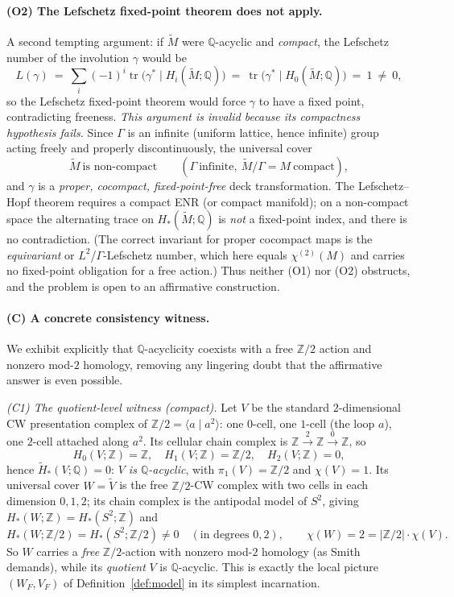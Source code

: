 \documentclass[12pt]{article}
\theoremstyle{definition}
\begin{document}
\paragraph{(O2) The Lefschetz fixed-point theorem does not apply.}
A second tempting argument: if $\widetilde M$ were $\mathbb{Q}$-acyclic and
\emph{compact}, the Lefschetz number of the involution $\gamma$ would be
\[
   L(\gamma)\ =\ \sum_i(-1)^i\operatorname{tr}\big(\gamma^*\mid
   H_i(\widetilde M;\mathbb{Q})\big)\ =\ \operatorname{tr}\big(\gamma^*\mid
   H_0(\widetilde M;\mathbb{Q})\big)\ =\ 1\ \neq\ 0,
\]
so the Lefschetz fixed-point theorem would force $\gamma$ to have a fixed point,
contradicting freeness. \emph{This argument is invalid because its compactness
hypothesis fails.} Since $\Gamma$ is an infinite (uniform lattice, hence
infinite) group acting freely and properly discontinuously, the universal cover
\[
   \widetilde M\ \text{is non-compact}\qquad(\Gamma\ \text{infinite},\
   \widetilde M/\Gamma=M\ \text{compact}),
\]
and $\gamma$ is a \emph{proper, cocompact, fixed-point-free} deck
transformation. The Lefschetz--Hopf theorem requires a compact ENR (or compact
manifold); on a non-compact space the alternating trace on
$H_*(\widetilde M;\mathbb{Q})$ is \emph{not} a fixed-point index, and there is no
contradiction. (The correct invariant for proper cocompact maps is the
\emph{equivariant} or $L^2$/$\Gamma$-Lefschetz number, which here equals
$\chi^{(2)}(M)$ and carries no fixed-point obligation for a free action.) Thus
neither (O1) nor (O2) obstructs, and the problem is open to an affirmative
construction.

\paragraph{(C) A concrete consistency witness.}
We exhibit explicitly that $\mathbb{Q}$-acyclicity coexists with a free
$\mathbb{Z}/2$ action and nonzero mod-$2$ homology, removing any lingering doubt
that the affirmative answer is even possible.

\emph{(C1) The quotient-level witness (compact).} Let $V$ be the standard
$2$-dimensional CW presentation complex of $\mathbb{Z}/2=\langle a\mid
a^2\rangle$: one $0$-cell, one $1$-cell (the loop $a$), one $2$-cell attached
along $a^2$. Its cellular chain complex is
$\mathbb{Z}\xrightarrow{\,2\,}\mathbb{Z}\xrightarrow{\,0\,}\mathbb{Z}$, so
\[
   H_0(V;\mathbb{Z})=\mathbb{Z},\quad H_1(V;\mathbb{Z})=\mathbb{Z}/2,\quad
   H_2(V;\mathbb{Z})=0,
\]
hence $\widetilde H_*(V;\mathbb{Q})=0$: \emph{$V$ is $\mathbb{Q}$-acyclic}, with
$\pi_1(V)=\mathbb{Z}/2$ and $\chi(V)=1$. Its universal cover $W=\widetilde V$ is
the free $\mathbb{Z}/2$-CW complex with two cells in each dimension $0,1,2$;
its chain complex is the antipodal model of $S^2$, giving
$H_*(W;\mathbb{Z})=H_*(S^2;\mathbb{Z})$ and
\[
   H_*(W;\mathbb{Z}/2)=H_*(S^2;\mathbb{Z}/2)\neq 0\quad(\text{in degrees }0,2),
   \qquad \chi(W)=2=|{\mathbb{Z}/2}|\cdot\chi(V).
\]
So $W$ carries a \emph{free} $\mathbb{Z}/2$-action with nonzero mod-$2$ homology
(as Smith demands), while its \emph{quotient} $V$ is $\mathbb{Q}$-acyclic. This
is exactly the local picture $(W_F,V_F)$ of Definition~\ref{def:model} in its
simplest incarnation.
\end{document}

